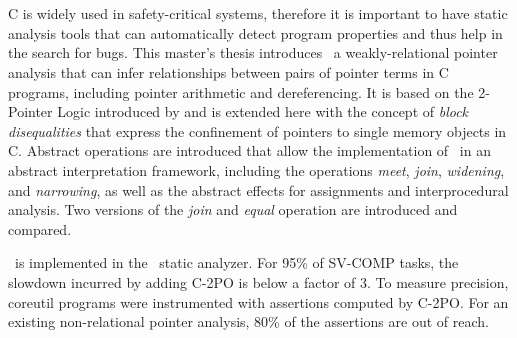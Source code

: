 \chapter{\abstractname}

C is widely used in safety-critical systems, therefore it is important to have static analysis tools that can automatically detect program properties and thus help in the search for bugs.
This master's thesis introduces \cpo\, a weakly-relational pointer analysis that can infer relationships between pairs of pointer terms in C programs, including pointer arithmetic and dereferencing.
It is based on the 2-Pointer Logic introduced by \textcite{2pointer} and is extended here with the concept of \emph{block disequalities} that express the confinement of pointers to single memory objects in C.
Abstract operations are introduced that allow the implementation of \cpo\ in an abstract interpretation framework, including the operations \emph{meet}, \emph{join}, \emph{widening}, and \emph{narrowing}, as well as the abstract effects for assignments and interprocedural analysis.
Two versions of the \emph{join} and \emph{equal} operation are introduced and compared.

\cpo\ is implemented in the \goblint\ static analyzer.
For 95\% of SV-COMP tasks, the slowdown incurred by adding
C-2PO is below a factor of 3. To measure precision, coreutil programs were instrumented with assertions computed by C-2PO.
For an existing non-relational pointer analysis, 80\% of the assertions are out of reach.
